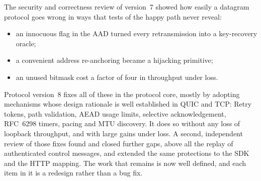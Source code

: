 The security and correctness review of version~7 showed how easily a datagram protocol goes wrong in ways that
tests of the happy path never reveal:
\begin{itemize}
  \item an innocuous flag in the AAD turned every retransmission into a key-recovery oracle;
  \item a convenient address re-anchoring became a hijacking primitive;
  \item an unused bitmask cost a factor of four in throughput under loss.
\end{itemize}
Protocol version~8 fixes all of these in the protocol core, mostly by adopting mechanisms whose design rationale
is well established in QUIC and TCP: Retry tokens, path validation, AEAD usage limits, selective
acknowledgement, RFC~6298 timers, pacing and MTU discovery. It does so without any loss of loopback throughput,
and with large gains under loss. A second, independent review of those fixes found and closed further gaps,
above all the replay of authenticated control messages, and extended the same protections to the SDK and the
HTTP mapping. The work that remains is now well defined, and each item in it is a redesign rather than a bug fix.
